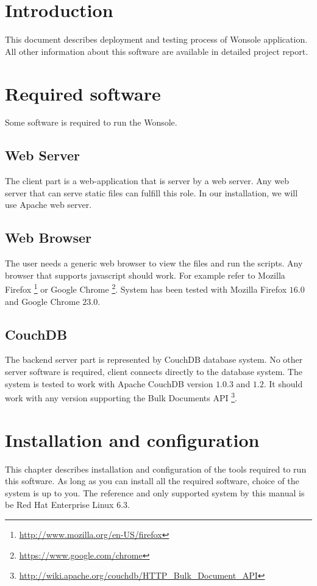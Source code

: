 \section{Introduction}
This document describes deployment and testing process of Wonsole application.
All other information about this software are available in detailed project
report.
\section{Required software}
Some software is required to run the Wonsole. 
\subsection{Web Server}
The client part is a web-application that is server by a web server. Any web
server that can serve static files can fulfill this role. In our installation,
we will use Apache web server.

\subsection{Web Browser}
The user needs a generic web browser to view the files and run the scripts. Any
browser that supports javascript should work. For example refer to Mozilla
Firefox \footnote{\url{http://www.mozilla.org/en-US/firefox}} or Google Chrome
\footnote{\url{https://www.google.com/chrome}}. System has been tested with
Mozilla Firefox $16.0$ and Google Chrome $23.0$. 

\subsection{CouchDB}
The backend server part is represented by CouchDB database system. No other
server software is required, client connects directly to the database system.
The system is tested to work with Apache CouchDB version $1.0.3$ and $1.2$. It
should work with any version supporting the Bulk Documents API
\footnote{\url{http://wiki.apache.org/couchdb/HTTP_Bulk_Document_API}}.





\section{Installation and configuration}
This chapter describes installation and configuration of the tools required to
run this software. As long as you can install all the required software,
choice of the system is up to you. The reference and only supported system by
this manual is be Red Hat Enterprise Linux 6.3.

